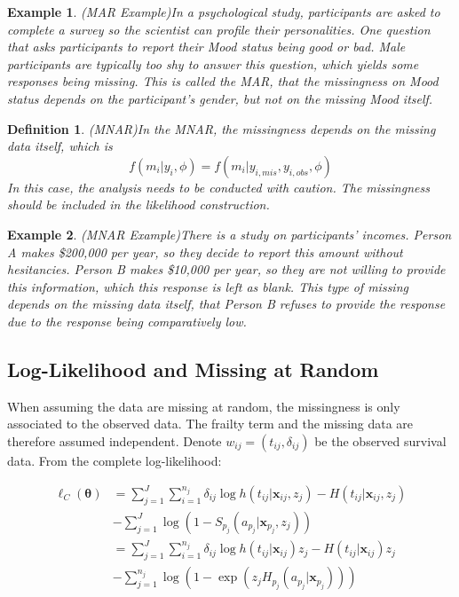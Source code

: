 \documentclass[preprint,12pt]{elsarticle}
\newtheorem{defn}{Definition}
\newtheorem{eg}{Example}
\begin{document}
\begin{eg}(MAR Example)\label{eg:MARExample}
    In a psychological study, participants are asked to complete a survey so the scientist can profile their personalities. 
    One question that asks participants to report their Mood status being good or bad. 
    Male participants are typically too shy to answer this question, which yields some responses being missing. 
    This is called the MAR, that the missingness on Mood status depends on the participant's gender, but not on the missing Mood itself.
\end{eg}
\begin{defn}(MNAR)\label{defn:MNAR}
    In the MNAR, the missingness depends on the missing data itself, which is 
    \begin{equation} 
        f(m_i|y_i,\phi)=f(m_i|y_{i,mis}, y_{i,obs}, \phi)
    \end{equation}
    In this case, the analysis needs to be conducted with caution. 
    The missingness should be included in the likelihood construction.
\end{defn}
\begin{eg}(MNAR Example)\label{eg:MNARExample}
    There is a study on participants' incomes. 
    Person A makes \$200,000 per year, so they decide to report this amount without hesitancies. 
    Person B makes \$10,000 per year, so they are not willing to provide this information, which this response is left as blank. 
    This type of missing depends on the missing data itself, that Person B refuses to provide the response due to the response being comparatively low. 
\end{eg}
\subsection{Log-Likelihood and Missing at Random}
When assuming the data are missing at random, the missingness is only associated to the observed data. 
The frailty term and the missing data are therefore assumed independent. 
Denote $w_{ij} = (t_{ij}, \delta_{ij})$ be the observed survival data.
From the complete log-likelihood:

\begin{align} 
    \ell_C(\boldsymbol{\theta})&=\sum_{j=1}^J\sum_{i=1}^{n_j}\delta_{ij}\log h(t_{ij}|\mathbf{x}_{ij}, z_j) - H(t_{ij}|\mathbf{x}_{ij}, z_j)\\
    &-\sum_{j=1}^J \log (1-S_{p_j}(a_{p_j}|\mathbf{x}_{p_j}, z_j)) \\
    &= \sum_{j=1}^J\sum_{i=1}^{n_j}\delta_{ij}\log h(t_{ij}|\mathbf{x}_{ij})z_j - H(t_{ij}|\mathbf{x}_{ij})z_j \\
    &- \sum_{j=1}^{n_j} \log(1- \exp(z_j H_{p_j}(a_{p_j}|\mathbf{x}_{p_j})))
\end{align}
\end{document}
